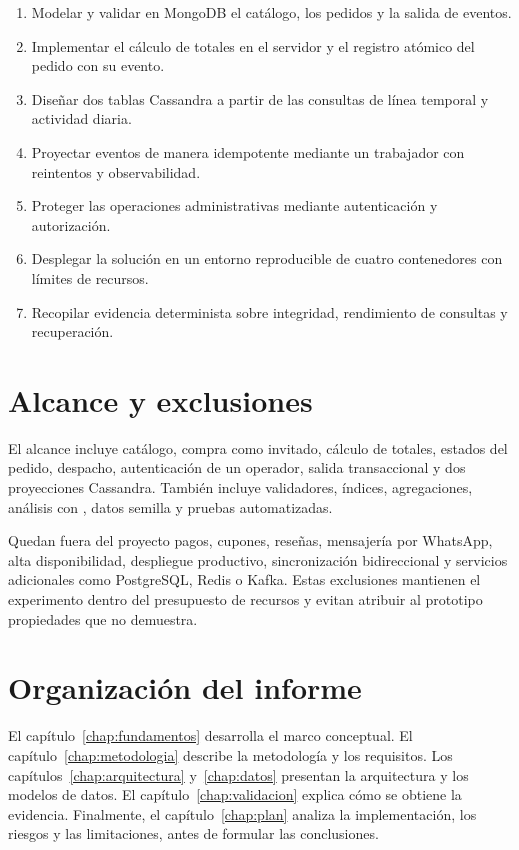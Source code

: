 \begin{enumerate}
  \item Modelar y validar en MongoDB el catálogo, los pedidos y la salida de eventos.
  \item Implementar el cálculo de totales en el servidor y el registro atómico del pedido con su evento.
  \item Diseñar dos tablas Cassandra a partir de las consultas de línea temporal y actividad diaria.
  \item Proyectar eventos de manera idempotente mediante un trabajador con reintentos y observabilidad.
  \item Proteger las operaciones administrativas mediante autenticación y autorización.
  \item Desplegar la solución en un entorno reproducible de cuatro contenedores con límites de recursos.
  \item Recopilar evidencia determinista sobre integridad, rendimiento de consultas y recuperación.
\end{enumerate}

\section{Alcance y exclusiones}

El alcance incluye catálogo, compra como invitado, cálculo de totales, estados del pedido, despacho, autenticación de un operador, salida transaccional y dos proyecciones Cassandra. También incluye validadores, índices, agregaciones, análisis con , datos semilla y pruebas automatizadas.

Quedan fuera del proyecto pagos, cupones, reseñas, mensajería por WhatsApp, alta disponibilidad, despliegue productivo, sincronización bidireccional y servicios adicionales como PostgreSQL, Redis o Kafka. Estas exclusiones mantienen el experimento dentro del presupuesto de recursos y evitan atribuir al prototipo propiedades que no demuestra.

\section{Organización del informe}

El capítulo~\ref{chap:fundamentos} desarrolla el marco conceptual. El capítulo~\ref{chap:metodologia} describe la metodología y los requisitos. Los capítulos~\ref{chap:arquitectura} y~\ref{chap:datos} presentan la arquitectura y los modelos de datos. El capítulo~\ref{chap:validacion} explica cómo se obtiene la evidencia. Finalmente, el capítulo~\ref{chap:plan} analiza la implementación, los riesgos y las limitaciones, antes de formular las conclusiones.
